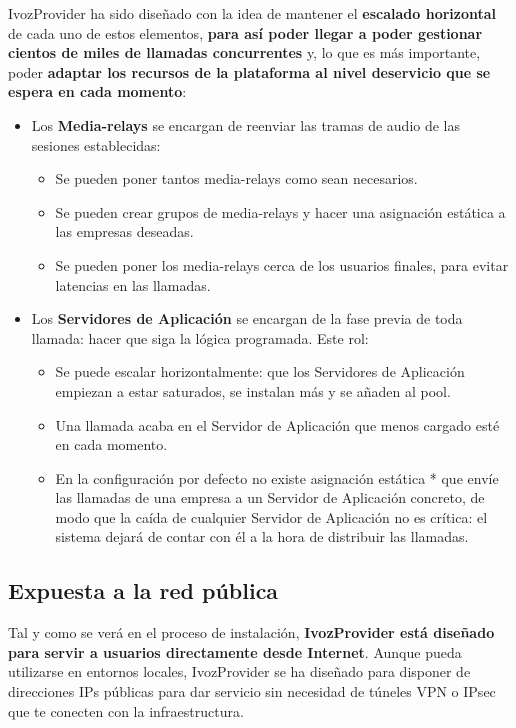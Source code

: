 \documentclass[letterpaper,10pt,spanish]{sphinxmanual}
\begin{document}
IvozProvider ha sido diseñado con la idea de mantener el \textbf{escalado horizontal} de cada uno de estos elementos, \textbf{para así poder llegar a poder gestionar cientos de miles de llamadas concurrentes} y, lo que es más importante, poder \textbf{adaptar los recursos de la plataforma al nivel deservicio que se espera en cada momento}:
\begin{itemize}
\item {} 
Los \textbf{Media-relays} se encargan de reenviar las tramas de audio de las sesiones establecidas:
\begin{itemize}
\item {} 
Se pueden poner tantos media-relays como sean necesarios.

\item {} 
Se pueden crear grupos de media-relays y hacer una asignación estática a las empresas deseadas.

\item {} 
Se pueden poner los media-relays cerca de los usuarios finales, para evitar latencias en las llamadas.

\end{itemize}

\item {} 
Los \textbf{Servidores de Aplicación} se encargan de la fase previa de toda llamada: hacer que siga la lógica programada. Este rol:
\begin{itemize}
\item {} 
Se puede escalar horizontalmente: que los Servidores de Aplicación empiezan a estar saturados, se instalan más y se añaden al pool.

\item {} 
Una llamada acaba en el Servidor de Aplicación que menos cargado esté en cada momento.

\item {} 
En la configuración por defecto no existe asignación estática * que envíe las llamadas de una empresa a un Servidor de Aplicación concreto, de modo que la caída de cualquier Servidor de Aplicación no es crítica: el sistema dejará de contar con él a la hora de distribuir las llamadas.

\end{itemize}

\end{itemize}


\subsection{Expuesta a la red pública}
\label{intro/what_is_ivozprovider:exposed-to-the-public-network}\label{intro/what_is_ivozprovider:exposed}
Tal y como se verá en el proceso de instalación, \textbf{IvozProvider está diseñado para servir a usuarios directamente desde Internet}. Aunque pueda utilizarse en entornos locales, IvozProvider se ha diseñado para disponer de direcciones IPs públicas para dar servicio sin necesidad de túneles VPN o IPsec que te conecten con la infraestructura.
\end{document}
